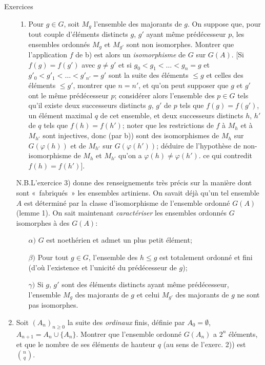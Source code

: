 \begin{enonce*}[remark]{Exercices}
\begin{enumerate}
\begin{enumerate}
\item Pour $g\in G$, soit $M_g$ l'ensemble des majorants de $g$. On
suppose que, pour tout couple d'éléments distincts $g$, $g'$ ayant
même prédécesseur $p$, les ensembles ordonnés $M_g$ et
$M_{g'}$ sont
non isomorphes. Montrer que l'application $f$ de b) est alors un
\emph{isomorphisme} de $G$ sur $G(A)$. [Si $f(g)=f(g')$ avec $g\neq
g'$ et si $g_0<g_1<\ldots<g_n=g$ et $g'_0<g'_1<\ldots <g'_{n'}=g'$
sont la suite des éléments $\leq g$ et celles des
éléments $\leq
g'$, montrer que $n=n'$, et qu'on peut supposer que $g$ et $g'$ ont
le même prédécesseur $p$; considérer alors l'ensemble
des $p\in G$
tels qu'il existe deux successeurs distincts $g$, $g'$ de $p$ tels
que $f(g)=f(g')$, un élément maximal $q$ de cet ensemble, et deux
successeurs distincts $h$, $h'$ de $q$ tels que $f(h)=f(h')$; noter
que les restrictions de $f$ à $M_h$ et à $M_{h'}$ sont injectives,
donc (par b)) sont des isomorphismes de $M_h$ sur $G(\varphi(h))$ et
de $M_{h'}$ sur $G(\varphi(h'))$; déduire de l'hypothèse de
non-isomorphisme de $M_h$ et $M_{h'}$ qu'on a $\varphi(h)\neq
\varphi(h')$. ce qui contredit $f(h)=f(h')$].
\end{enumerate}
N.B.\pageoriginale L'exercice 3) donne des renseignements très
précis sur la manière dont sont « fabriqués » les ensembles
artiniens. On savait déjà qu'un tel ensemble $A$ est
déterminé par
la classe d'isomorphisme de l'ensemble ordonné $G(A)$ (lemme 1). On
sait maintenant \emph{caractériser} les ensembles ordonnés $G$
isomorphes à des $G(A)$:
\begin{itemize}
\item[$\alpha)$] $G$ est noethérien et admet un plus petit
élément;

\item[$\beta)$] Pour tout $g\in G$, l'ensemble des $h\leq g$ est
totalement ordonné et fini (d'où l'existence et l'unicité du
prédécesseur de $g$);

\item[$\gamma)$] Si $g$, $g'$ sont des éléments distincts ayant
même prédécesseur, l'ensemble $M_g$ des majorants de $g$ et celui
$M_{g'}$ des majorants de $g$ ne sont pas isomorphes.
\end{itemize}

\item Soit $(A_n)_{n\geq 0}$ la suite des \emph{ordinaux} finis,
définie par $A_0=∅$, $A_{n+1}=A_n\cup \{A_n\}$. Montrer
que l'ensemble ordonné $G(A_n)$ a $2^n$ éléments, et que le nombre
de ses éléments de hauteur $q$ (au sens de l'exerc. 2)) est
$\binom{n}{q}$.
\end{enumerate}
\end{enonce*}

\begin{thebibliography}{10}%
 
\end{thebibliography}
